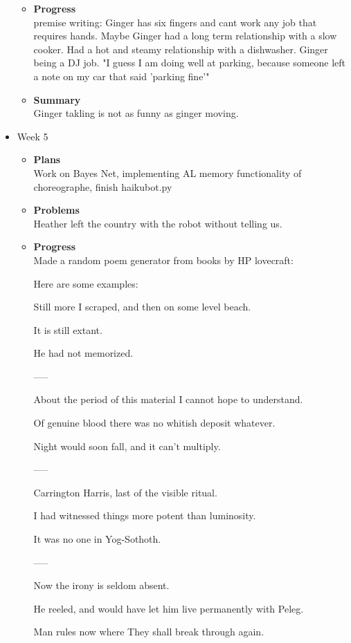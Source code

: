 \begin{itemize}
\begin{itemize}
				\item \textbf{Progress} \\
				premise writing: Ginger has six fingers and cant work any job that requires hands. Maybe Ginger had a long term relationship with a slow cooker. Had a hot and steamy relationship with a dishwasher. Ginger being a DJ job. "I guess I am doing well at parking, because someone left a note on my car that said 'parking fine'"
				\item \textbf{Summary} \\
				Ginger takling is not as funny as ginger moving.
			\end{itemize}
		\item{Week 5}
			\begin{itemize}
				\item \textbf{Plans} \\
				Work on Bayes Net, implementing AL memory functionality of choreographe, finish haikubot.py
				\item \textbf{Problems} \\
				Heather left the country with the robot without telling us.
				\item \textbf{Progress} \\
					Made a random poem generator from books by HP lovecraft:

					Here are some examples:

		Still more I scraped, and then on some level beach. 

		It is still extant. 

		He had not memorized. 


		-----

		About the period of this material I cannot hope to understand. 

		Of genuine blood there was no whitish deposit whatever. 

		Night would soon fall, and it can't multiply. 

		-----

		Carrington Harris, last of the visible ritual. 

		I had witnessed things more potent than luminosity. 

		It was no one in Yog-Sothoth. 

		-----

		Now the irony is seldom absent. 

		He reeled, and would have let him live permanently with Peleg. 

		Man rules now where They shall break through again. 


\end{itemize}
\end{itemize}
